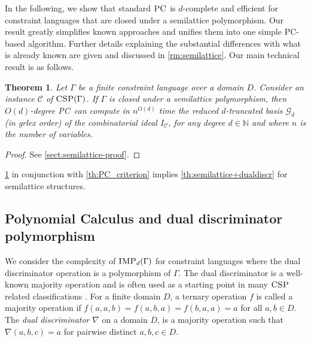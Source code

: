 \documentclass[11pt]{article}
\newcommand{\Cc}{\mathcal{C}}
\newcommand{\CSP}{\textsc{CSP}}
\newcommand{\IMP}{\textsc{IMP}}
\newcommand{\PC}{\textsc{PC}}
\newcommand{\grlex}{\textsf{grlex }}
\newcommand{\1}{\textbf{1}}
\newcommand{\GB}{\text{Gr\"{o}bner} }
\newtheorem{theorem}{Theorem}[section]
\begin{document}
In the following, we show that standard $\PC$ is $d$-complete and efficient for constraint languages that are closed under a semilattice polymorphism. Our result greatly simplifies known approaches \cite{BulatovRSTOC22, Mastrolilli21TALG} and unifies them into one simple
PC-based algorithm. Further details explaining the substantial differences with what is already known are given and discussed in \cref{rm:semilattice}. 
%
Our main technical result is as follows.
\begin{theorem}\label{th:semilattice}
Let $\Gamma$ be a finite constraint language over a domain $D$. Consider an instance $\Cc$ of $\CSP(\Gamma)$. If $\Gamma$ is closed under a semilattice polymorphism, then $O(d)$-degree \PC\  can compute in $n^{O(d)}$ time the reduced $d$-truncated \GB basis $\mathcal{G}_d$ (in \grlex order) of the combinatorial ideal $I_\Cc$, for any degree $d \in \mathbb{N}$ and where $n$ is the number of variables.
\end{theorem}
\begin{proof}
    See \cref{sect:semilattice-proof}.
\end{proof}
%
%
\cref{th:semilattice} in conjunction with \cref{th:PC_criterion} implies \cref{th:semilattice+dualdiscr} for semilattice structures.
%

\subsection{Polynomial Calculus and dual discriminator polymorphism}\label{sect:PCdual}
We consider the complexity of $\IMP_d(\Gamma)$ for constraint languages where the dual discriminator operation is a polymorphism of $\Gamma$. 
The dual discriminator is a well-known majority operation \cite{Jeavons:1997:CPC,barto_et_al:DFU:2017:6959} and is often used as a starting point in many $\CSP$ related classifications \cite{barto_et_al:DFU:2017:6959}. For a finite domain $D$, a ternary operation $f$ is called a majority operation if  $f(a,a,b)=f(a,b,a)=f(b,a,a)=a$ for all $a,b\in D$. The \emph{dual discriminator} $\nabla$ on a domain $D$, is a majority operation such that $\nabla(a,b,c)=a$ for pairwise distinct $a,b,c\in D$.
\end{document}
